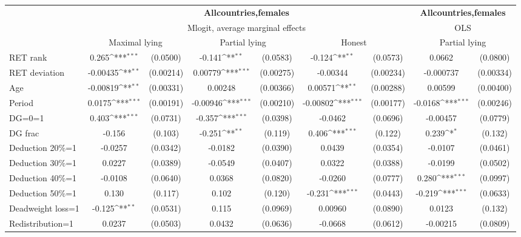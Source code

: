 \def\sym#1{\ifmmode^{#1}\else\(^{#1}\)\fi}
\begin{tabular}{l|cccccc|cc}
\hline\hline
&\multicolumn{6}{c|}{\bf All\space{}countries,\space{}females}&\multicolumn{2}{c}{\bf All\space{}countries,\space{}females}\\ &\multicolumn{6}{c|}{Mlogit, average marginal effects }&\multicolumn{2}{c}{OLS}\\
                &\multicolumn{2}{c}{Maximal lying}&\multicolumn{2}{c}{Partial lying}&\multicolumn{2}{c}{Honest}  &\multicolumn{2}{c}{Partial lying}\\
\hline
RET rank        &    0.265\sym{***}& (0.0500)&   -0.141\sym{**} & (0.0583)&   -0.124\sym{**} & (0.0573)&   0.0662         & (0.0800)\\
RET deviation   & -0.00435\sym{**} &(0.00214)&  0.00779\sym{***}&(0.00275)& -0.00344         &(0.00234)&-0.000737         &(0.00334)\\
Age             & -0.00819\sym{**} &(0.00331)&  0.00248         &(0.00366)&  0.00571\sym{**} &(0.00288)&  0.00599         &(0.00400)\\
Period          &   0.0175\sym{***}&(0.00191)& -0.00946\sym{***}&(0.00210)& -0.00802\sym{***}&(0.00177)&  -0.0168\sym{***}&(0.00246)\\
DG=0=1          &    0.403\sym{***}& (0.0731)&   -0.357\sym{***}& (0.0398)&  -0.0462         & (0.0696)& -0.00457         & (0.0779)\\
DG frac         &   -0.156         &  (0.103)&   -0.251\sym{**} &  (0.119)&    0.406\sym{***}&  (0.122)&    0.239\sym{*}  &  (0.132)\\
Deduction 20\%=1&  -0.0257         & (0.0342)&  -0.0182         & (0.0390)&   0.0439         & (0.0354)&  -0.0107         & (0.0461)\\
Deduction 30\%=1&   0.0227         & (0.0389)&  -0.0549         & (0.0407)&   0.0322         & (0.0388)&  -0.0199         & (0.0502)\\
Deduction 40\%=1&  -0.0108         & (0.0640)&   0.0368         & (0.0820)&  -0.0260         & (0.0777)&    0.280\sym{***}& (0.0997)\\
Deduction 50\%=1&    0.130         &  (0.117)&    0.102         &  (0.120)&   -0.231\sym{***}& (0.0443)&   -0.219\sym{***}& (0.0633)\\
Deadweight loss=1&   -0.125\sym{**} & (0.0531)&    0.115         & (0.0969)&  0.00960         & (0.0890)&   0.0123         &  (0.132)\\
Redistribution=1&   0.0237         & (0.0503)&   0.0432         & (0.0636)&  -0.0668         & (0.0612)& -0.00215         & (0.0809)\\

\end{tabular}
